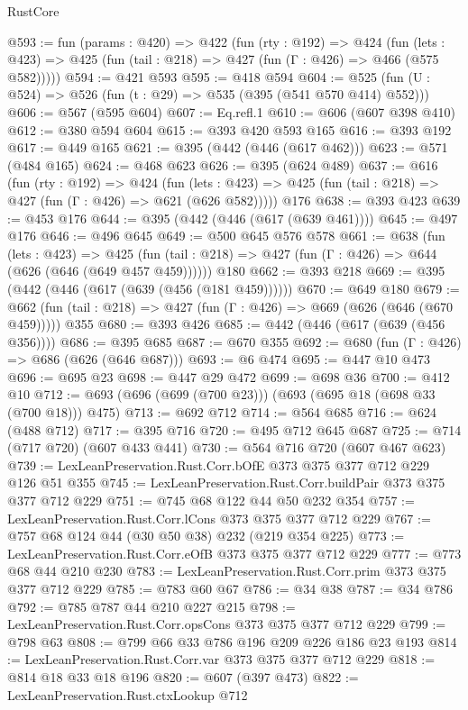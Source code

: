 \begin{lexlean}{RustCore}
\begin{coremodule}
{\begin{coremodule}
{{{{{@593 := fun (params : @420) =>
  @422
    (fun (rty : @192) =>
    @424
      (fun (lets : @423) => @425 (fun (tail : @218) => @427 (fun (Γ : @426) => @466 (@575 @582)))))
@594 := @421 @593
@595 := @418 @594
@604 := @525 (fun (U : @524) => @526 (fun (t : @29) => @535 (@395 (@541 @570 @414) @552)))
@606 := @567 (@595 @604)
@607 := Eq.refl.{1}
@610 := @606 (@607 @398 @410)
@612 := @380 @594 @604
@615 := @393 @420 @593 @165
@616 := @393 @192
@617 := @449 @165
@621 := @395 (@442 (@446 (@617 @462)))
@623 := @571 (@484 @165)
@624 := @468 @623
@626 := @395 (@624 @489)
@637 := @616
    (fun (rty : @192) =>
    @424
      (fun (lets : @423) => @425 (fun (tail : @218) => @427 (fun (Γ : @426) => @621 (@626 @582)))))
    @176
@638 := @393 @423
@639 := @453 @176
@644 := @395 (@442 (@446 (@617 (@639 @461))))
@645 := @497 @176
@646 := @496 @645
@649 := @500 @645 @576 @578
@661 := @638
    (fun (lets : @423) =>
    @425 (fun (tail : @218) => @427 (fun (Γ : @426) => @644 (@626 (@646 (@649 @457 @459))))))
    @180
@662 := @393 @218
@669 := @395 (@442 (@446 (@617 (@639 (@456 (@181 @459))))))
@670 := @649 @180
@679 := @662 (fun (tail : @218) => @427 (fun (Γ : @426) => @669 (@626 (@646 (@670 @459))))) @355
@680 := @393 @426
@685 := @442 (@446 (@617 (@639 (@456 @356))))
@686 := @395 @685
@687 := @670 @355
@692 := @680 (fun (Γ : @426) => @686 (@626 (@646 @687)))
@693 := @6 @474
@695 := @447 @10 @473
@696 := @695 @23
@698 := @447 @29 @472
@699 := @698 @36
@700 := @412 @10
@712 := @693 (@696 (@699 (@700 @23))) (@693 (@695 @18 (@698 @33 (@700 @18))) @475)
@713 := @692 @712
@714 := @564 @685
@716 := @624 (@488 @712)
@717 := @395 @716
@720 := @495 @712 @645 @687
@725 := @714 (@717 @720) (@607 @433 @441)
@730 := @564 @716 @720 (@607 @467 @623)
@739 := LexLeanPreservation.Rust.Corr.bOfE @373 @375 @377 @712 @229 @126 @51 @355
@745 := LexLeanPreservation.Rust.Corr.buildPair @373 @375 @377 @712 @229
@751 := @745 @68 @122 @44 @50 @232 @354
@757 := LexLeanPreservation.Rust.Corr.lCons @373 @375 @377 @712 @229
@767 := @757 @68 @124 @44 (@30 @50 @38) @232 (@219 @354 @225)
@773 := LexLeanPreservation.Rust.Corr.eOfB @373 @375 @377 @712 @229
@777 := @773 @68 @44 @210 @230
@783 := LexLeanPreservation.Rust.Corr.prim @373 @375 @377 @712 @229
@785 := @783 @60 @67
@786 := @34 @38
@787 := @34 @786
@792 := @785 @787 @44 @210 @227 @215
@798 := LexLeanPreservation.Rust.Corr.opsCons @373 @375 @377 @712 @229
@799 := @798 @63
@808 := @799 @66 @33 @786 @196 @209 @226 @186 @23 @193
@814 := LexLeanPreservation.Rust.Corr.var @373 @375 @377 @712 @229
@818 := @814 @18 @33 @18 @196
@820 := @607 (@397 @473)
@822 := LexLeanPreservation.Rust.ctxLookup @712
}}}}}
\end{coremodule}}
\end{coremodule}
\end{lexlean}
